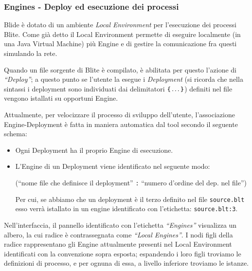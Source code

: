 \subsubsection*{Engines - Deploy ed esecuzione dei processi}

Blide è dotato di un ambiente \emph{Local Environment} per l'esecuzione dei
processi Blite. Come già detto il Local Environment permette di eseguire
localmente (in una Java Virtual Machine) più Engine e di gestire la
comunicazione fra questi simulando la rete.

Quando un file sorgente di Blite è compilato, è abilitata per questo l'azione
di \emph{``Deploy''}; a questo punto se l'utente la esegue i \emph{Deployment}
(si ricorda che nella sintassi i deployment sono individuati dai delimitatori
$\verb#{# \ldots \verb#}#$) definiti nel file vengono istallati su
opportuni Engine.

Attualmente, per velocizzare il processo di sviluppo dell'utente, l'associazione
Engine-Deployment è fatta in maniera automatica dal tool secondo il seguente
schema:

\begin{itemize}
  \item Ogni Deployment ha il proprio Engine di esecuzione.
  \item L'Engine di un Deployment viene identificato nel seguente modo: 
  
  (``nome file che definisce il deployment'' \texttt{:} ``numero d'ordine del
  dep. nel file'')
  
  Per cui, se abbiamo che un deployment è il terzo definito nel file
  \texttt{source.blt} esso verrà istallato in un engine identificato con
  l'etichetta: \texttt{source.blt:3}.
\end{itemize}

Nell'interfaccia, il pannello identificato con l'etichetta \emph{``Engines''}
visualizza un albero, la cui radice è contrassegnata come \emph{``Local
Engines''}. I nodi figli della radice rappresentano gli Engine attualmente
presenti nel Local Environment identificati con la convenzione sopra esposta;
espandendo i loro figli troviamo le definizioni di processo, e per ognuna di
essa, a livello inferiore troviamo le istanze.

